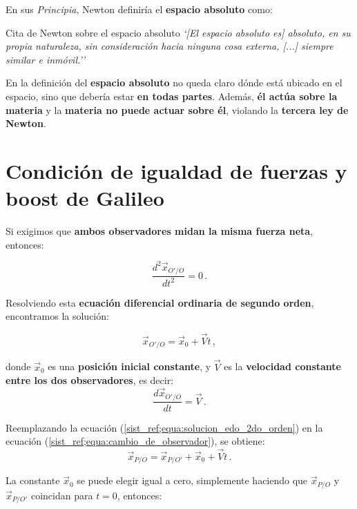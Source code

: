 \documentclass[../apunte_mecanica_clasica.tex]{subfiles}%
\begin{document}
En sus \textit{Principia}, Newton definiría el \textbf{espacio absoluto} como:

\begin{apuntebloque}{Cita de Newton sobre el espacio absoluto}
\textit{`[El espacio absoluto es] absoluto, en su propia naturaleza, sin consideración hacia ninguna cosa externa, [...] siempre similar e inmóvil.''}
\end{apuntebloque}

\noindent En la definición del \textbf{espacio absoluto} no queda claro dónde está ubicado en el espacio, sino que debería estar \textbf{en todas partes}. Además, \textbf{él actúa sobre la materia} y la \textbf{materia no puede actuar sobre él}, violando la \textbf{tercera ley de Newton}.

\section{Condición de igualdad de fuerzas y boost de Galileo}

Si exigimos que \textbf{ambos observadores midan la misma fuerza neta}, entonces:

\begin{equation*}
    \frac{d^2 \vec{x}_{O'/O}}{dt^2} = 0 \,.
\end{equation*}

Resolviendo esta \textbf{ecuación diferencial ordinaria de segundo orden}, encontramos la solución:

\begin{equation}\label{sist_ref;equa:solucion_edo_2do_orden}
    \vec{x}_{O'/O} = \vec{x}_0 + \vec{V}t \,,
\end{equation}

donde $\vec{x}_0$ es una \textbf{posición inicial constante}, y $\vec{V}$ es la \textbf{velocidad constante entre los dos observadores}, es decir:
\begin{equation*}
    \frac{d \vec{x}_{O'/O}}{dt} = \vec{V}\,.
\end{equation*}

Reemplazando la ecuación (\ref{sist_ref;equa:solucion_edo_2do_orden}) en la ecuación (\ref{sist_ref;equa:cambio_de_observador}), se obtiene:
\begin{equation}\label{sist_ref;equa:cambio_de_obsevardores_incerciales}
    \vec{x}_{P/O} = \vec{x}_{P/O'} + \vec{x}_0 + \vec{V}t \,.
\end{equation}

La constante $\vec{x}_0$ se puede elegir igual a cero, simplemente haciendo que $\vec{x}_{P/O}$ y $\vec{x}_{P/O'}$ coincidan para $t = 0$, entonces:
\end{document}
